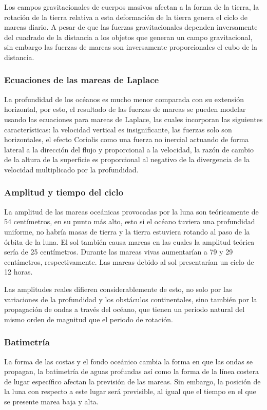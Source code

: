 Los campos gravitacionales de cuerpos masivos afectan a la forma de la tierra, la rotación de la tierra relativa a esta deformación de la tierra genera el ciclo de mareas diario. A pesar de que las fuerzas gravitacionales dependen inversamente del cuadrado de la distancia a los objetos que generan un campo gravitacional, sin embargo las fuerzas de mareas son inversamente proporcionales el cubo de la distancia.

\subsubsection{Ecuaciones de las mareas de Laplace}
La profundidad de los océanos es mucho menor comparada con su extensión horizontal, por esto, el resultado de las fuerzas de mareas se pueden modelar usando las ecuaciones para mareas de Laplace, las cuales incorporan las siguientes características: la velocidad vertical es insignificante, las fuerzas solo son horizontales, el efecto Coriolis como una fuerza no inercial actuando de forma lateral a la dirección del flujo y proporcional a la velocidad, la razón de cambio de la altura de la superficie es proporcional al negativo de la divergencia de la velocidad multiplicado por la profundidad.

\subsubsection{Amplitud y tiempo del ciclo}
La amplitud de las mareas oceánicas provocadas por la luna son teóricamente de 54 centímetros, en su punto más alto, esto si el océano tuviera una profundidad uniforme, no habría masas de tierra y la tierra estuviera rotando al paso de la órbita de la luna. El sol también causa mareas en las cuales la amplitud teórica sería de 25 centímetros. Durante las mareas vivas  aumentarían a  79 y 29 centímetros, respectivamente. Las mareas debido al sol presentarían un ciclo de 12 horas.

Las amplitudes reales difieren considerablemente de esto, no solo por las variaciones de la profundidad y los obstáculos continentales, sino también por la propagación de ondas a través del océano, que tienen un periodo natural del mismo orden de magnitud que el periodo de rotación.

\subsubsection{Batimetría}
La forma de las costas y el fondo oceánico cambia la forma en que las ondas se propagan, la batimetría de aguas profundas así como la forma de la línea costera de lugar específico afectan la previsión de las mareas. Sin embargo, la posición de la luna con respecto a este lugar será previsible, al igual que el tiempo en el que se presente marea baja y alta. 

